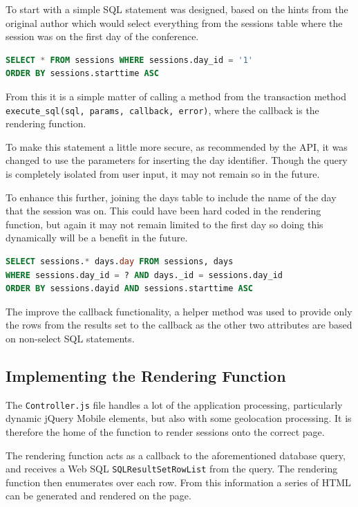 \documentclass[11pt, a4paper]{article}
\begin{document}
To start with a simple SQL statement was designed, based on the hints from the
original author which would select everything from the sessions table where the
session was on the first day of the conference.

\begin{lstlisting}[language=sql]
SELECT * FROM sessions WHERE sessions.day_id = '1' 
ORDER BY sessions.starttime ASC
\end{lstlisting}

From this it is a simple matter of calling a method from the transaction method
\texttt{execute\_sql(sql, params, callback, error)}, where the callback is the 
rendering function.

To make this statement a little more secure, as recommended by the API, it was
changed to use the parameters for inserting the day identifier. Though the 
query is completely isolated from user input, it may not remain so in the 
future.

To enhance this further, joining the days table to include the name of the day
that the session was on. This could have been hard coded in the rendering
function, but again it may not remain limited to the first day so doing this
dynamically will be a benefit in the future.

\begin{lstlisting}[language=sql]
SELECT sessions.* days.day FROM sessions, days 
WHERE sessions.day_id = ? AND days._id = sessions.day_id 
ORDER BY sessions.dayid AND sessions.starttime ASC
\end{lstlisting}

The improve the callback functionality, a helper method was used to provide 
only the rows from the results set to the callback as the other two attributes 
are based on non-select SQL statements.

\subsection{Implementing the Rendering Function}
The \texttt{Controller.js} file handles a lot of the application processing,
particularly dynamic jQuery Mobile elements, but also with some geolocation
processing. It is therefore the home of the function to render sessions onto
the correct page.

The rendering function acts as a callback to the aforementioned database query,
and receives a Web SQL \texttt{SQLResultSetRowList} from the query. The 
rendering function then enumerates over each row. From this information a 
series of HTML can be generated and rendered on the page.
\end{document}
